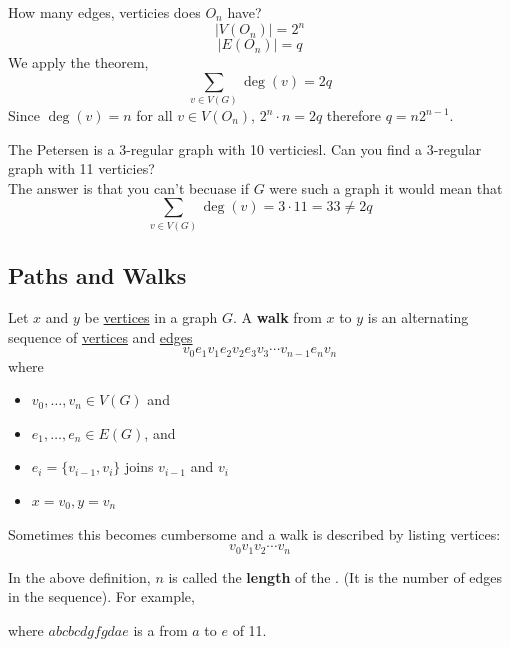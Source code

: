 \documentclass[english, 11pt]{article}
\begin{document}
How many edges, verticies does $O_n$ have?
\[ |V(O_n)| = 2^n \]
\[ |E(O_n)| = q \]
We apply the theorem,
\[ \sum_{v \in V(G)} \deg(v) = 2q  \]
Since $\deg(v) = n$ for all $v \in V(O_n)$, $2^n \cdot n = 2q$ therefore $q = n2^{n-1}$.
\begin{exmp}
  The Petersen  is a 3-regular graph with 10 verticiesl. Can you find a 3-regular graph with 11 verticies? \\

  The answer is that you can't becuase if $G$ were such a graph it would mean that
  \[ \sum_{v \in V(G)} \deg (v) = 3 \cdot 11 = 33 \not = 2q \]
\end{exmp}

\subsection{Paths and Walks}

\begin{defn}[walk]\label{walk}
Let $x$ and $y$ be  \hyperref[terminology]{vertices} in a graph $G$. A \textbf{walk} from $x$ to $y$ is  an alternating sequence of \hyperref[graph]{vertices} and \hyperref[graph]{edges}
\[ v_0e_1v_1e_2v_2e_3v_3\cdots v_{n-1}e_nv_n \]
where \begin{itemize}
  \item $v_0,\ldots,v_n \in V(G)$ and
  \item $e_1,\ldots,e_n \in E(G)$, and
  \item  $e_i = \{v_{i-1},v_i\}$ joins $v_{i-1}$ and $v_i$
  \item $x = v_0, y = v_n$
\end{itemize}
Sometimes this becomes cumbersome and a walk is described by listing vertices:
\[ v_0v_1v_2\cdots v_n \]
\end{defn}
\begin{defn}[length]\label{length}
In the above definition, $n$ is called the \textbf{length} of the . (It is the number of edges in the sequence). For example,
\begin{center}
\end{center}
where $abcbcdgfgdae$ is a  from $a$ to $e$ of  11.
\end{defn}
\end{document}
